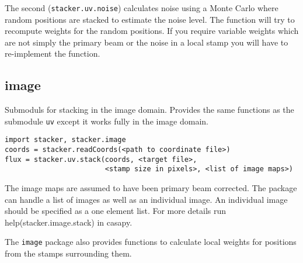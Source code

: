 \documentclass{article}
\begin{document}
The second ({\tt stacker.uv.noise}) calculates noise using a Monte Carlo
where random positions are stacked to estimate the noise level. 
The function will try to recompute weights for the random positions.
If you require variable weights which are not simply the primary beam
or the noise in a local stamp you will have to re-implement the function.

\subsection{image}
Submoduls for stacking in the image domain.
Provides the same functions as the submodule {\tt uv} except it works fully in the image domain.
\begin{verbatim}
import stacker, stacker.image
coords = stacker.readCoords(<path to coordinate file>)
flux = stacker.uv.stack(coords, <target file>, 
                        <stamp size in pixels>, <list of image maps>)
\end{verbatim}
The image maps are assumed to have been primary beam corrected.
The package can handle a list of images as well as an individual image.
An individual image should be specified as a one element list.
For more details run help(stacker.image.stack) in casapy.

The {\tt image} package also provides functions to calculate local weights for
positions from the stamps surrounding them. 

 
\end{document}
